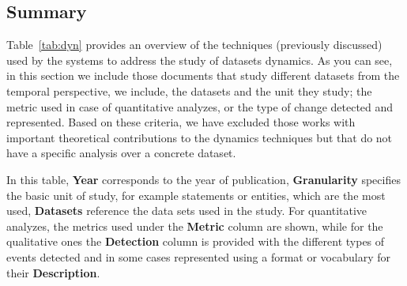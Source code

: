 \documentclass[sw]{iosart2x}
\begin{document}


\subsection{Summary}\label{Summary1}

Table~\ref{tab:dyn} provides an overview of the techniques (previously discussed) used by the systems to address the study of datasets dynamics. As you can see, in this section we include those documents that study different datasets from the temporal perspective, we include, the datasets and the unit they study; the metric used in case of quantitative analyzes, or the type of change detected and represented. Based on these criteria, we have excluded those works with important theoretical contributions to the dynamics techniques but that do not have a specific analysis over a concrete dataset.

In this table, \textbf{Year} corresponds to the year of publication, \textbf{Granularity} specifies the basic unit of study, for example statements or entities, which are the most used, \textbf{Datasets} reference the data sets used in the study. For quantitative analyzes, the metrics used under the \textbf{Metric} column are shown, while for the qualitative ones the \textbf{Detection} column is provided with the different types of events detected and in some cases represented using a format or vocabulary for their \textbf{Description}.
\end{document}
